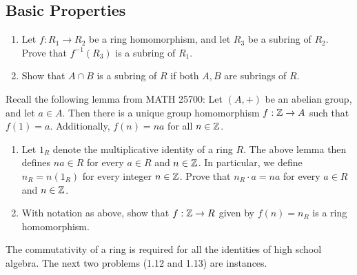 \documentclass[../psets.tex]{subfiles}
\begin{document}
\subsection*{Basic Properties}
\begin{enumerate}[start=7]
    \item Let $f:R_1\to R_2$ be a ring homomorphism, and let $R_3$ be a subring of $R_2$. Prove that $f^{-1}(R_3)$ is a subring of $R_1$.
    \item Show that $A\cap B$ is a subring of $R$ if both $A,B$ are subrings of $R$.
\end{enumerate}
Recall the following lemma from MATH 25700: Let $(A,+)$ be an abelian group, and let $a\in A$. Then there is a unique group homomorphism $f:\mathbb{Z}\to A$ such that $f(1)=a$. Additionally, $f(n)=na$ for all $n\in\mathbb{Z}$.
\begin{enumerate}[resume]
    \item Let $1_R$ denote the multiplicative identity of a ring $R$. The above lemma then defines $na\in R$ for every $a\in R$ and $n\in\mathbb{Z}$. In particular, we define $n_R=n(1_R)$ for every integer $n\in\mathbb{Z}$. Prove that $n_R\cdot a=na$ for every $a\in R$ and $n\in\mathbb{Z}$.
    \item With notation as above, show that $f:\mathbb{Z}\to R$ given by $f(n)=n_R$ is a ring homomorphism.
\end{enumerate}
The commutativity of a ring is required for all the identities of high school algebra. The next two problems (1.12 and 1.13) are instances.
\end{document}
